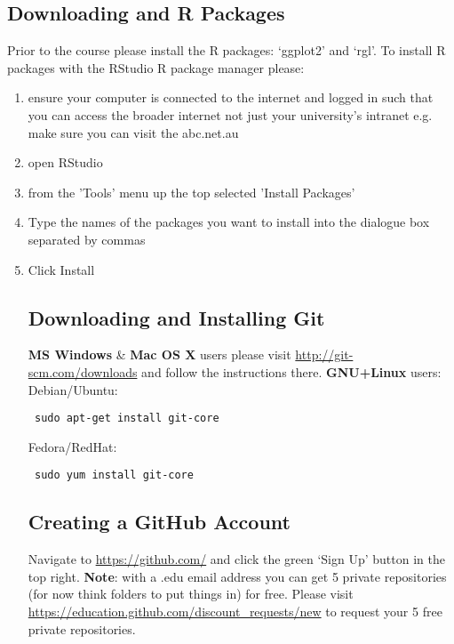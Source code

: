 \documentclass{article}[12pt]
\begin{document}
\subsection*{Downloading and R Packages}
Prior to the course please install the R packages: `ggplot2' and `rgl'.
To install R packages with the RStudio R package manager please: \begin{enumerate}
\item ensure your computer is connected to the internet and logged in such that you can access the broader internet not just your university's intranet e.g. make sure you can visit the abc.net.au
\item open RStudio
\item from the 'Tools' menu up the top selected 'Install Packages'
\item Type the names of the packages you want to install into the dialogue box separated by commas
\item Click Install
\



\subsection*{Downloading and Installing Git}
\textbf{MS Windows} \& \textbf{Mac OS X} users please visit \url{http://git-scm.com/downloads} and follow the instructions there.\newline
\newline
\textbf{GNU+Linux} users:\\ 
Debian/Ubuntu: \begin{verbatim} sudo apt-get install git-core \end{verbatim}
Fedora/RedHat: \begin{verbatim} sudo yum install git-core \end{verbatim}

\subsection*{Creating a GitHub Account}
Navigate to \url{https://github.com/} and click the green `Sign Up' button in the top right.
\newline
\newline
\textbf{Note}: with a .edu email address you can get 5 private repositories (for now think folders to put things in) for free.
Please visit \url{https://education.github.com/discount_requests/new} to request your 5 free private repositories.
\clearpage





\end{enumerate}
\end{document}
